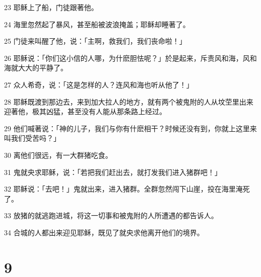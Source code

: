 \par 23 耶稣上了船，门徒跟著他。
\par 24 海里忽然起了暴风，甚至船被波浪掩盖；耶稣却睡著了。
\par 25 门徒来叫醒了他，说：「主啊，救我们，我们丧命啦！」
\par 26 耶稣说：「你们这小信的人哪，为什麽胆怯呢？」於是起来，斥责风和海，风和海就大大的平静了。
\par 27 众人希奇，说：「这是怎样的人？连风和海也听从他了！」
\par 28 耶稣既渡到那边去，来到加大拉人的地方，就有两个被鬼附的人从坟茔里出来迎著他，极其凶猛，甚至没有人能从那条路上经过。
\par 29 他们喊著说：「神的儿子，我们与你有什麽相干？时候还没有到，你就上这里来叫我们受苦吗？」
\par 30 离他们很远，有一大群猪吃食。
\par 31 鬼就央求耶稣，说：「若把我们赶出去，就打发我们进入猪群吧！」
\par 32 耶稣说：「去吧！」鬼就出来，进入猪群。全群忽然闯下山崖，投在海里淹死了。
\par 33 放猪的就逃跑进城，将这一切事和被鬼附的人所遭遇的都告诉人。
\par 34 合城的人都出来迎见耶稣，既见了就央求他离开他们的境界。

\chapter{9}

